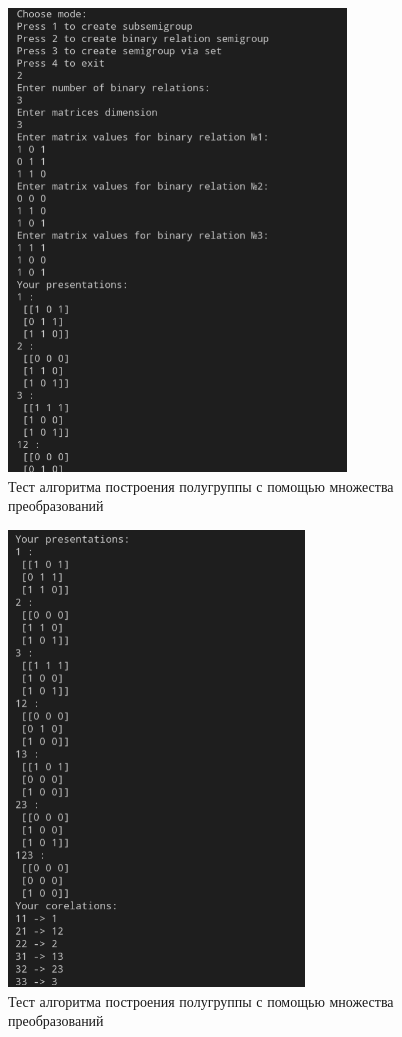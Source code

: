 \documentclass[bachelor, och, labwork]{shiza}
\begin{document}
      \begin{figure}[H]
        \centering
        \includegraphics[width=0.8\textwidth]{photo/4.png}
        \caption{Тест алгоритма построения полугруппы с помощью множества преобразований}
      \end{figure}

      \begin{figure}[H]
        \centering
        \includegraphics[width=0.7\textwidth]{photo/5.png}
        \caption{Тест алгоритма построения полугруппы с помощью множества преобразований}
      \end{figure}
\end{document}
